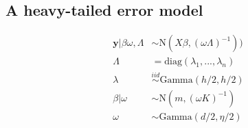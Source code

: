 \documentclass[10pt]{article}
\newcommand{\by}{\mathbf{y}}
\begin{document}
    \subsection*{A heavy-tailed error model}

    \begin{align*}
      \by| \beta \omega, \Lambda &\sim \text{N}(X \beta, (\omega \Lambda)^{-1}))\\
      \Lambda &= \text{diag}(\lambda_1,...,\lambda_n)\\
      \lambda &\stackrel{iid}{\sim} \text{Gamma}(h/2, h/2)\\
      \beta | \omega &\sim \text{N}(m, (\omega K)^{-1})\\
      \omega &\sim \text{Gamma}(d/2, \eta/2)
    \end{align*}
\end{document}
